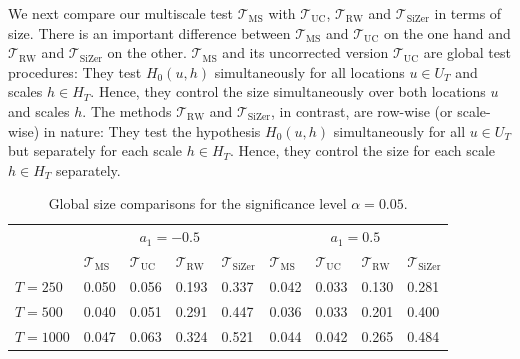 We next compare our multiscale test $\mathcal{T}_{\text{MS}}$ with $\mathcal{T}_{\text{UC}}$, $\mathcal{T}_{\text{RW}}$ and $\mathcal{T}_{\text{SiZer}}$ in terms of size. There is an important difference between $\mathcal{T}_{\text{MS}}$ and $\mathcal{T}_{\text{UC}}$ on the one hand and $\mathcal{T}_{\text{RW}}$ and $\mathcal{T}_{\text{SiZer}}$ on the other. $\mathcal{T}_{\text{MS}}$ and its uncorrected version $\mathcal{T}_{\text{UC}}$ are global test procedures: They test $H_0(u,h)$ simultaneously for all locations $u \in U_T$ and scales $h \in H_T$. Hence, they control the size simultaneously over both locations $u$ and scales $h$. The methods $\mathcal{T}_{\text{RW}}$ and $\mathcal{T}_{\text{SiZer}}$, in contrast, are row-wise (or scale-wise) in nature: They test the hypothesis $H_0(u,h)$ simultaneously for all $u \in U_T$ but separately for each scale $h \in H_T$. Hence, they control the size for each scale $h \in H_T$ separately. 


\begin{table}[t!]
\footnotesize{
\caption{Global size comparisons for the significance level $\alpha =0.05$.}\label{tab:sim:size:compare}
\begin{tabularx}{\textwidth}{l@{\hskip 20pt} Z@{\hskip 6pt}Z@{\hskip 6pt}Z@{\hskip 6pt}Z@{\hskip 20pt}Z@{\hskip 6pt}Z@{\hskip 6pt}Z@{\hskip 6pt}Z}
\toprule
 &  &  \\
 & $\mathcal{T}_{\text{MS}}$ & $\mathcal{T}_{\text{UC}}$ & $\mathcal{T}_{\text{RW}}$ & $\mathcal{T}_{\text{SiZer}}$ & $\mathcal{T}_{\text{MS}}$ & $\mathcal{T}_{\text{UC}}$ & $\mathcal{T}_{\text{RW}}$ & $\mathcal{T}_{\text{SiZer}}$ \\
$T=250$  & 0.050 & 0.056 & 0.193 & 0.337  & 0.042 & 0.033 & 0.130 & 0.281 \\ 
$T=500$  & 0.040 & 0.051 & 0.291 & 0.447  & 0.036 & 0.033 & 0.201 & 0.400 \\ 
$T=1000$ & 0.047 & 0.063 & 0.324 & 0.521  & 0.044 & 0.042 & 0.265 & 0.484 \\ 
\bottomrule
\end{tabularx}}
\vspace{0.2cm}
\end{table}


